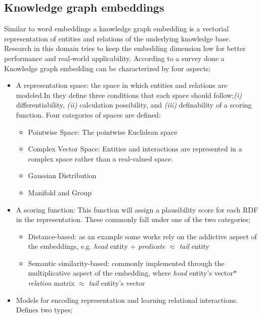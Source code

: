 \subsection{Knowledge graph embeddings}
\label{kgeBK}
Similar to word embeddings a knowledge graph embedding is a vectorial representation of entities and relations of the underlying knowledge base. Research in this domain tries to keep the embedding dimension low for better performance and real-world applicability. \newline
According to a survey done \cite{KGsurvey} a Knowledge graph embedding can be characterized by four aspects;
\begin{itemize}
\item{A representation space: the space in which entities and relations are modeled.\newline In \cite{KGconditions} they define three conditions that each space should follow;\textit{(i)} differentiability, \textit{(ii)} calculation possibility, and \textit{(iii)} definability of a scoring function. Four categories of spaces are defined:}
	\begin{itemize}
	\item{Pointwise Space: The pointwise Euclidean space}
	\item{Complex Vector Space: Entities and interactions are represented in a complex space rather than a real-valued space.}
	\item{Gaussian Distribution \cite{GaussianWE}}
	\item{Manifold and Group}
	\end{itemize}
\item{A scoring function: This function will assign a plausibility score for each RDF in the representation. These commonly fall under one of the two categories;}
	\begin{itemize}
	\item{Distance-based: as an example some works \cite{TransE} rely on the addictive aspect of the embeddings, e.g. \textit{head} entity + \textit{predicate} $\approx$ \textit{tail} entity}
	\item{Semantic similarity-based: commonly implemented through the multiplicative aspect of the embedding, where \textit{head} entity's vector$\ast$ \textit{relation} matrix $\approx$ \textit{tail} entity's vector}
	\end{itemize}	
\item{Models for encoding representation and learning relational interactions. \cite{KGsurvey2} Defines two types;}
	\begin{itemize}

\end{itemize}
\end{itemize}
